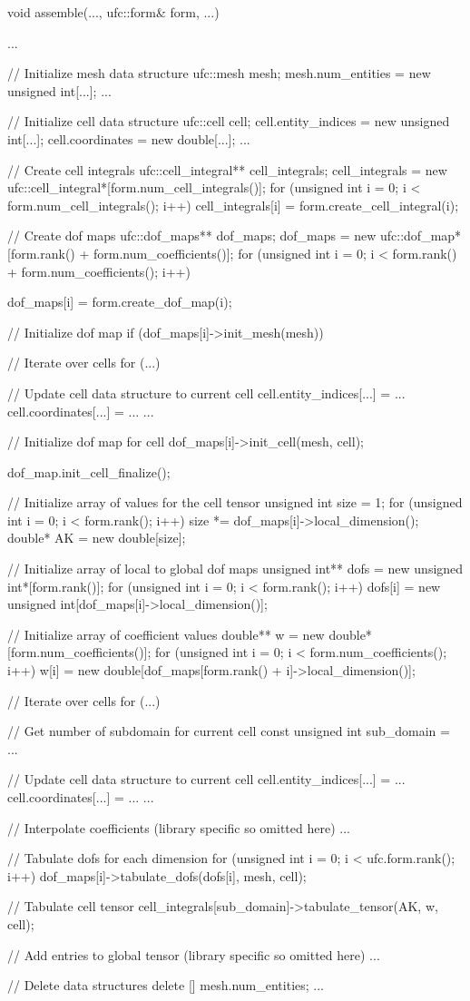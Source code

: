 \scriptsize
\begin{code}
void assemble(..., ufc::form& form, ...)
{
  ...

  // Initialize mesh data structure
  ufc::mesh mesh;
  mesh.num_entities = new unsigned int[...];
  ...

  // Initialize cell data structure
  ufc::cell cell;
  cell.entity_indices = new unsigned int[...];
  cell.coordinates = new double[...];
  ...

  // Create cell integrals
  ufc::cell_integral** cell_integrals;
  cell_integrals = new ufc::cell_integral*[form.num_cell_integrals()];
  for (unsigned int i = 0; i < form.num_cell_integrals(); i++)
    cell_integrals[i] = form.create_cell_integral(i);

  // Create dof maps
  ufc::dof_maps** dof_maps;
  dof_maps = new ufc::dof_map*[form.rank() + form.num_coefficients()];
  for (unsigned int i = 0; i < form.rank() + form.num_coefficients(); i++)
  {
    dof_maps[i] = form.create_dof_map(i);

    // Initialize dof map
    if (dof_maps[i]->init_mesh(mesh))
    { 
      // Iterate over cells
      for (...)
      {
        // Update cell data structure to current cell
        cell.entity_indices[...] = ...
        cell.coordinates[...] = ...
        ...
       
        // Initialize dof map for cell
        dof_maps[i]->init_cell(mesh, cell);        
      }

      dof_map.init_cell_finalize();
    }
  }

  // Initialize array of values for the cell tensor
  unsigned int size = 1;
  for (unsigned int i = 0; i < form.rank(); i++)
    size *= dof_maps[i]->local_dimension();
  double* AK = new double[size];

  // Initialize array of local to global dof maps
  unsigned int** dofs = new unsigned int*[form.rank()];
  for (unsigned int i = 0; i < form.rank(); i++)
    dofs[i] = new unsigned int[dof_maps[i]->local_dimension()];

  // Initialize array of coefficient values
  double** w = new double*[form.num_coefficients()];
  for (unsigned int i = 0; i < form.num_coefficients(); i++)
    w[i] = new double[dof_maps[form.rank() + i]->local_dimension()];

  // Iterate over cells
  for (...)
  {
    // Get number of subdomain for current cell
    const unsigned int sub_domain = ...

    // Update cell data structure to current cell
    cell.entity_indices[...] = ...
    cell.coordinates[...] = ...
    ...

    // Interpolate coefficients (library specific so omitted here)
    ...

    // Tabulate dofs for each dimension
    for (unsigned int i = 0; i < ufc.form.rank(); i++)
      dof_maps[i]->tabulate_dofs(dofs[i], mesh, cell);

    // Tabulate cell tensor
    cell_integrals[sub_domain]->tabulate_tensor(AK, w, cell);

    // Add entries to global tensor (library specific so omitted here)
    ...
  }

  // Delete data structures
  delete [] mesh.num_entities;
  ...
}
\end{code}
\normalsize
